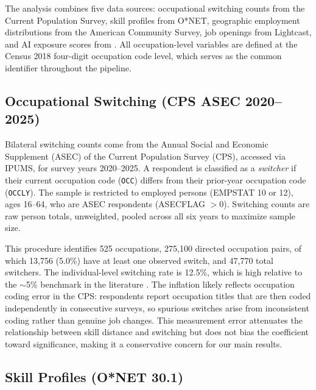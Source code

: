 \documentclass[12pt]{article}
\begin{document}
The analysis combines five data sources: occupational switching counts from the Current Population Survey, skill profiles from O*NET, geographic employment distributions from the American Community Survey, job openings from Lightcast, and AI exposure scores from \citet{eloundou2023}. All occupation-level variables are defined at the Census 2018 four-digit occupation code level, which serves as the common identifier throughout the pipeline.

\subsection{Occupational Switching (CPS ASEC 2020--2025)}
\label{sec:data_cps}

Bilateral switching counts come from the Annual Social and Economic Supplement (ASEC) of the Current Population Survey (CPS), accessed via IPUMS, for survey years 2020--2025. A respondent is classified as a \emph{switcher} if their current occupation code (\texttt{OCC}) differs from their prior-year occupation code (\texttt{OCCLY}). The sample is restricted to employed persons (EMPSTAT 10 or 12), ages 16--64, who are ASEC respondents (ASECFLAG $> 0$). Switching counts are raw person totals, unweighted, pooled across all six years to maximize sample size.

This procedure identifies 525 occupations, 275,100 directed occupation pairs, of which 13,756 (5.0\%) have at least one observed switch, and 47,770 total switchers. The individual-level switching rate is 12.5\%, which is high relative to the $\sim$5\% benchmark in the literature \citep{kambourov2008}. The inflation likely reflects occupation coding error in the CPS: respondents report occupation titles that are then coded independently in consecutive surveys, so spurious switches arise from inconsistent coding rather than genuine job changes. This measurement error attenuates the relationship between skill distance and switching but does not bias the coefficient toward significance, making it a conservative concern for our main results.

\subsection{Skill Profiles (O*NET 30.1)}
\label{sec:data_onet}
\end{document}

